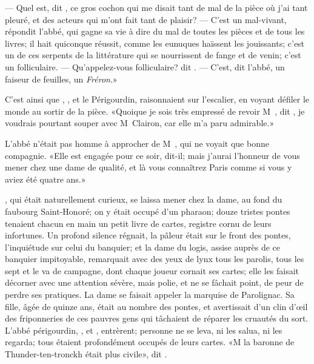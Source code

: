 — Quel est, dit , ce gros cochon qui me disait tant de mal de la
pièce où j’ai tant pleuré, et des acteurs qui m’ont fait tant de
plaisir? — C’est un mal-vivant, répondit l’abbé, qui gagne sa vie à dire
du mal de toutes les pièces et de tous les livres; il hait quiconque
réussit, comme les eunuques haïssent les jouissants; c’est un de ces
serpents de la littérature qui se nourrissent de fange et de venin;
c’est un folliculaire. — Qu’appelez-vous folliculaire? dit .
— C’est, dit l’abbé, un faiseur de feuilles, un \emph{Fréron}.»

C’est ainsi que , , et le Périgourdin, raisonnaient sur
l’escalier, en voyant défiler le monde au sortir de la pièce. «Quoique
je sois très empressé de revoir M~, dit , je
voudrais pourtant souper avec M~Clairon, car elle m’a paru
admirable.»

L’abbé n’était pas homme à approcher de M~, qui ne
voyait que bonne compagnie. «Elle est engagée pour ce soir, dit-il; mais
j’aurai l’honneur de vous mener chez une dame de qualité, et là vous
connaîtrez Paris comme si vous y aviez été quatre ans.»

, qui était naturellement curieux, se laissa mener chez la dame,
au fond du faubourg Saint-Honoré; on y était occupé d’un pharaon; douze
tristes pontes tenaient chacun en main un petit livre de cartes,
registre cornu de leurs infortunes. Un profond silence régnait, la
pâleur était sur le front des pontes, l’inquiétude sur celui du
banquier; et la dame du logis, assise auprès de ce banquier
impitoyable, remarquait avec des yeux de lynx tous les parolis, tous
les sept  et le va de campagne, dont chaque joueur cornait ses cartes;
elle les faisait décorner avec une attention sévère, mais polie, et ne
se fâchait point, de peur de perdre ses pratiques. La dame se faisait
appeler la marquise de Parolignac. Sa fille, âgée de quinze ans, était
au nombre des pontes, et avertissait d’un clin d’œil des friponneries
de ces pauvres gens qui tâchaient de réparer les cruautés du sort.
L’abbé périgourdin, , et , entrèrent; personne ne se leva,
ni les salua, ni les regarda; tous étaient profondément occupés de
leurs cartes. «M la baronne de Thunder-ten-tronckh était plus
civile», dit .

